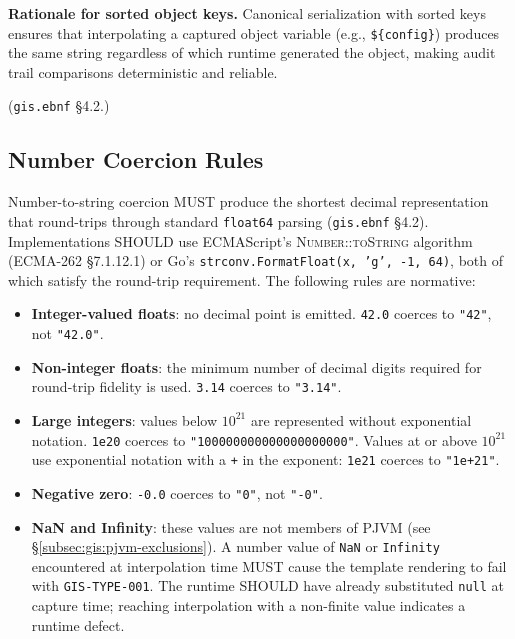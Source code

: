 \noindent\textbf{Rationale for sorted object keys.}
Canonical serialization with sorted keys ensures that interpolating a
captured object variable (e.g., \texttt{\$\{config\}}) produces the same
string regardless of which runtime generated the object,
making audit trail comparisons deterministic and reliable.

(\texttt{gis.ebnf} \S4.2.)

\subsection{Number Coercion Rules}
\label{subsec:gis:coercion-number}

Number-to-string coercion MUST produce the shortest decimal representation
that round-trips through standard \texttt{float64} parsing
(\texttt{gis.ebnf} \S4.2).
Implementations SHOULD use ECMAScript's \textsc{Number::toString} algorithm
(ECMA-262 \S7.1.12.1) or Go's \texttt{strconv.FormatFloat(x, 'g', -1, 64)},
both of which satisfy the round-trip requirement.
The following rules are normative:

\begin{itemize}
  \item \textbf{Integer-valued floats}: no decimal point is emitted.
    \texttt{42.0} coerces to \texttt{"42"}, not \texttt{"42.0"}.

  \item \textbf{Non-integer floats}: the minimum number of decimal digits
    required for round-trip fidelity is used.
    \texttt{3.14} coerces to \texttt{"3.14"}.

  \item \textbf{Large integers}: values below $10^{21}$ are represented
    without exponential notation.
    \texttt{1e20} coerces to \texttt{"100000000000000000000"}.
    Values at or above $10^{21}$ use exponential notation with a
    \texttt{+} in the exponent: \texttt{1e21} coerces to
    \texttt{"1e+21"}.

  \item \textbf{Negative zero}: \texttt{-0.0} coerces to \texttt{"0"},
    not \texttt{"-0"}.

  \item \textbf{NaN and Infinity}: these values are not members of PJVM
    (see \S\ref{subsec:gis:pjvm-exclusions}).
    A number value of \texttt{NaN} or \texttt{Infinity} encountered at
    interpolation time MUST cause the template rendering to fail with
    \texttt{GIS-TYPE-001}.
    The runtime SHOULD have already substituted \texttt{null} at capture
    time; reaching interpolation with a non-finite value indicates a
    runtime defect.
\end{itemize}

